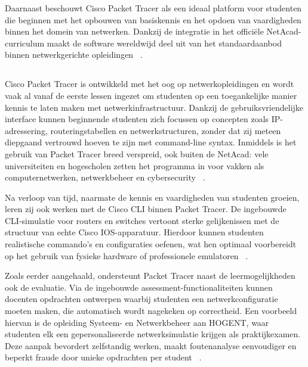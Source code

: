 \vspace{0.3cm}

Daarnaast beschouwt Cisco Packet Tracer als een ideaal platform voor studenten die beginnen met het opbouwen van basiskennis en het opdoen van vaardigheden binnen het domein van netwerken. Dankzij de integratie in het officiële NetAcad-curriculum maakt de software wereldwijd deel uit van het standaardaanbod binnen netwerkgerichte opleidingen ~\autocite{packetTracerResources2025}.



\subsection{}%
\label{sec:Gebruik in het onderwijs}

Cisco Packet Tracer is ontwikkeld met het oog op netwerkopleidingen en wordt vaak al vanaf de eerste lessen ingezet om studenten op een toegankelijke manier kennis te laten maken met netwerkinfrastructuur. Dankzij de gebruiksvriendelijke interface kunnen beginnende studenten zich focussen op concepten zoals IP-adressering, routeringstabellen en netwerkstructuren, zonder dat zij meteen diepgaand vertrouwd hoeven te zijn met command-line syntax. Inmiddels is het gebruik van Packet Tracer breed verspreid, ook buiten de NetAcad: vele universiteiten en hogescholen zetten het programma in voor vakken als computernetwerken, netwerkbeheer en cybersecurity ~\autocite{Allison2022}.

\vspace{0.3cm}

Na verloop van tijd, naarmate de kennis en vaardigheden van studenten groeien, leren zij ook werken met de Cisco CLI binnen Packet Tracer. De ingebouwde CLI-simulatie voor routers en switches vertoont sterke gelijkenissen met de structuur van echte Cisco IOS-apparatuur. Hierdoor kunnen studenten realistische commando’s en configuraties oefenen, wat hen optimaal voorbereidt op het gebruik van fysieke hardware of professionele emulatoren ~\autocite{Allison2022}.

\vspace{0.3cm}

Zoals eerder aangehaald, ondersteunt Packet Tracer naast de leermogelijkheden ook de evaluatie. Via de ingebouwde assessment-functionaliteiten kunnen docenten opdrachten ontwerpen waarbij studenten een netwerkconfiguratie moeten maken, die automatisch wordt nagekeken op correctheid. Een voorbeeld hiervan is de opleiding Systeem- en Netwerkbeheer aan HOGENT, waar studenten elk een gepersonaliseerde netwerksimulatie krijgen als praktijkexamen. Deze aanpak bevordert zelfstandig werken, maakt foutenanalyse eenvoudiger en beperkt fraude door unieke opdrachten per student ~\autocite{asee_peer_2016}.

